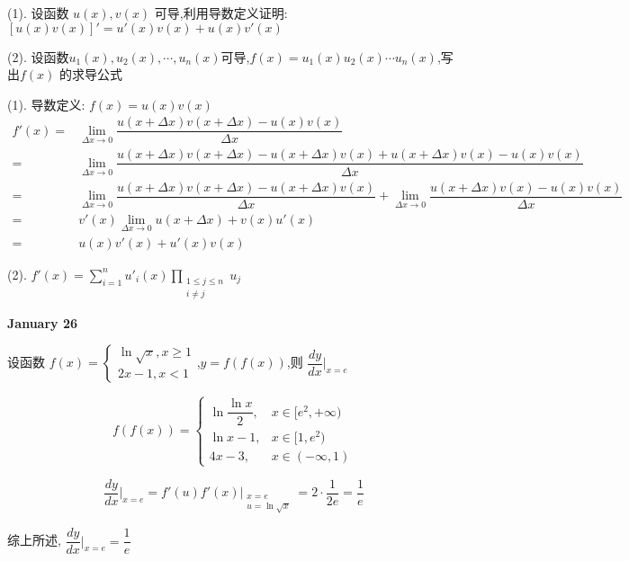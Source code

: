 \begin{example}[][Exam: 27.4.8]
	(1). 设函数 $u(x),v(x)$ 可导,利用导数定义证明:$[u(x)v(x)]'=u'(x)v(x)+u(x)v'(x)$

	(2). 设函数$u_{1}(x),u_{2}(x),\cdots,u_{n}(x)$可导,$f(x)=u_{1}(x)u_{2}(x)\cdots u_{n}(x)$,写出$f(x)$ 的求导公式
\end{example}

\begin{solution}

	(1). 导数定义: $f(x) = u(x)v(x)$
	\begin{align*}
		f'(x) = & \lim\limits_{\Delta x\to 0}\dfrac{u(x+\Delta x)v(x+\Delta x)-u(x)v(x)}{\Delta x}\\
		  	  = & \lim\limits_{\Delta x\to 0}\dfrac{u(x+\Delta x)v(x+\Delta x)-u(x+\Delta x)v(x)+u(x+\Delta x)v(x)-u(x)v(x)}{\Delta x}\\
		      = & \lim\limits_{\Delta x\to 0}\dfrac{u(x+\Delta x)v(x+\Delta x)-u(x+\Delta x)v(x)}{\Delta x}+\lim\limits_{\Delta x\to 0}\dfrac{u(x+\Delta x)v(x)-u(x)v(x)}{\Delta x}\\
		      = & v'(x)\lim\limits_{\Delta x\to 0} u(x+\Delta x)+v(x)u'(x)\\
			  = & u(x)v'(x)+u'(x)v(x)
	\end{align*}

	(2). $f'(x) = \sum\limits_{i=1}^{n}u'_{i}(x)\prod\limits_{\substack{1\leq j\leq n\\ i\neq j }}u_{j}$
\end{solution}

\textcolor{purplea}{\textbf{January 26}}

\begin{example}[][Exam: 27.4.9]
	设函数 $f(x)=\begin{cases}
		\ln\sqrt{x},x\geq 1\\2x-1,x<1
	\end{cases}$,$y=f(f(x))$,则 $\dfrac{dy}{dx}\big|_{x=e}$
\end{example}

\begin{solution}
\begin{anymark}[方法一]
	$$f(f(x)) = 
	\begin{cases}
		\ln\dfrac{\ln x}{2}, & x\in[e^{2},+\infty)\\
		\ln x -1, & x\in [1,e^{2})\\
		4x-3, & x\in(-\infty,1)
	\end{cases}$$
\end{anymark}
	
\begin{anymark}[方法二]
	$$\dfrac{dy}{dx}\big|_{x=e} = f'(u)f'(x)\big|_{\substack{x = e\\u = \ln\sqrt{x}}}=2\cdot \dfrac{1}{2e} =\dfrac{1}{e}$$
\end{anymark}
	综上所述, $\dfrac{dy}{dx}\big|_{x=e} = \dfrac{1}{e}$
\end{solution}

